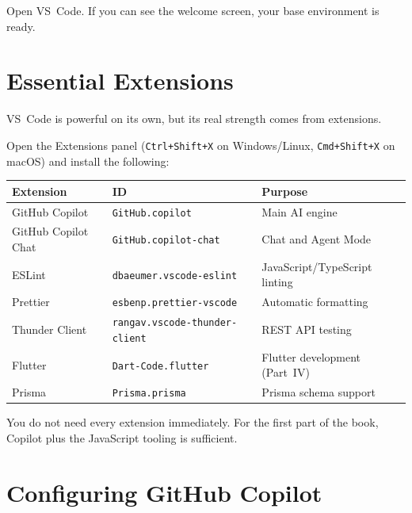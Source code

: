 \begin{checkpointbox}
Open VS~Code. If you can see the welcome screen, your base environment is ready.
\end{checkpointbox}

\section{Essential Extensions}

VS~Code is powerful on its own, but its real strength comes from extensions.

\begin{praticabox}[title={Hands-on --- Installing the core extensions}]
Open the Extensions panel (\texttt{Ctrl+Shift+X} on Windows/Linux, \texttt{Cmd+Shift+X} on macOS) and install the following:
\end{praticabox}

\begin{center}
\begin{tabularx}{\textwidth}{l l X}
\toprule
\textbf{Extension} & \textbf{ID} & \textbf{Purpose} \\
\midrule
GitHub Copilot & \texttt{GitHub.copilot} & Main AI engine \\
GitHub Copilot Chat & \texttt{GitHub.copilot-chat} & Chat and Agent Mode \\
ESLint & \texttt{dbaeumer.vscode-eslint} & JavaScript/TypeScript linting \\
Prettier & \texttt{esbenp.prettier-vscode} & Automatic formatting \\
Thunder Client & \texttt{rangav.vscode-thunder-client} & REST API testing \\
Flutter & \texttt{Dart-Code.flutter} & Flutter development (Part~IV) \\
Prisma & \texttt{Prisma.prisma} & Prisma schema support \\
\bottomrule
\end{tabularx}
\end{center}

\begin{tipbox}
You do not need every extension immediately. For the first part of the book, Copilot plus the JavaScript tooling is sufficient.
\end{tipbox}

\section{Configuring GitHub Copilot}

